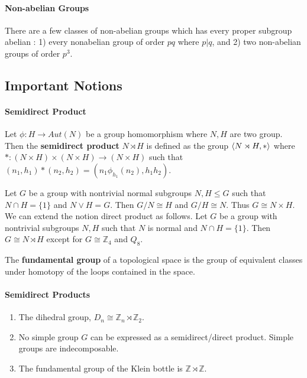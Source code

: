 \paragraph{Non-abelian Groups}
	There are a few classes of non-abelian groups which has every proper subgroup abelian : 
	1) every nonabelian group of order $pq$ where $p|q$, and
	2) two non-abelian groups of order $p^3$.

\subsection*{Important Notions}
\paragraph{Semidirect Product}
\begin{definition}
	Let $\phi : H \to Aut(N)$ be a group homomorphism where $N,H$ are two group.
	Then the \textbf{semidirect product} $N \rtimes H$ is defined as the group $\left\langle N \rtimes H,\ast \right\rangle$ where $\ast : (N \times H) \times (N \times H) \to (N \times H)$ such that $(n_1,h_1) \ast (n_2,h_2) = (n_1 \phi_{h_1}(n_2),h_1h_2)$.
\end{definition}

	Let $G$ be a group with nontrivial normal subgroups $N,H \le G$ such that $N \cap H = \{ 1 \}$ and $N \vee H = G$. Then $G/N \cong H$ and $G/H \cong N$. Thus $G \cong N \times H$.\\

	We can extend the notion direct product as follows.
	Let $G$ be a group with nontrivial subgroups $N,H$ such that $N$ is normal and $N \cap H = \{ 1 \}$. Then $G \cong N \rtimes H$ except for $G \cong \mathbb{Z}_4$ and $Q_8$.
	
\begin{definition}
	The \textbf{fundamental group} of a topological space is the group of equivalent classes under homotopy of the loops contained in the space.
\end{definition}

\paragraph{Semidirect Products}
\begin{enumerate}
	\item The dihedral group, $D_n \cong \mathbb{Z}_n \rtimes \mathbb{Z}_2$.
	\item No simple group $G$ can be expressed as a semidirect/direct product.
		\subitem Simple groups are indecomposable.
	\item The fundamental group of the Klein bottle is $\mathbb{Z} \rtimes \mathbb{Z}$.\\
\end{enumerate}


